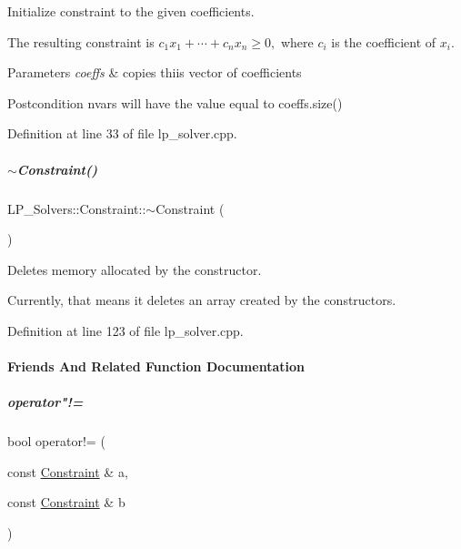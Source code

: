 Initialize constraint to the given coefficients. 

The resulting constraint is $ c_1x_1 + \cdots + c_nx_n \geq 0, $ where $ c_i $ is the coefficient of $ x_i $. 
\begin{DoxyParams}{Parameters}
{\em coeffs} & copies thiis vector of coefficients \\
\hline
\end{DoxyParams}
\begin{DoxyPostcond}{Postcondition}
{\ttfamily nvars} will have the value equal to {\ttfamily coeffs.\+size()} 
\end{DoxyPostcond}


Definition at line 33 of file lp\+\_\+solver.\+cpp.

\mbox{\label{group___c_l_s_solvers_a2949083e68c41842b613bd8cf78c6389}} 
\subparagraph{\texorpdfstring{$\sim$\+Constraint()}{~Constraint()}}
{\footnotesize\ttfamily L\+P\+\_\+\+Solvers\+::\+Constraint\+::$\sim$\+Constraint (\begin{DoxyParamCaption}{ }\end{DoxyParamCaption})}



Deletes memory allocated by the constructor. 

Currently, that means it deletes an array created by the constructors. 

Definition at line 123 of file lp\+\_\+solver.\+cpp.



\paragraph{Friends And Related Function Documentation}
\mbox{\label{group___c_l_s_solvers_ab67011dc88bf8927d50bf3806e792f8b}} 
\subparagraph{\texorpdfstring{operator"!=}{operator!=}}
{\footnotesize\ttfamily bool operator!= (\begin{DoxyParamCaption}\item[{const \hyperlink{group___c_l_s_solvers_class_l_p___solvers_1_1_constraint}{Constraint} \&}]{a,  }\item[{const \hyperlink{group___c_l_s_solvers_class_l_p___solvers_1_1_constraint}{Constraint} \&}]{b }\end{DoxyParamCaption})\hspace{0.3cm}{\ttfamily [friend]}}



